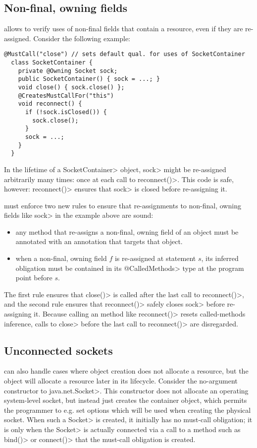 \subsection{Non-final, owning fields}
\label{sec:non-final-owning}

\CreatesMustCallFor allows \tool to verify uses of non-final fields
that contain a resource, even if they are re-assigned. Consider
the following example:

\begin{lstlisting}[frame=tb,belowskip=3mm]
  @MustCall("close") // sets default qual. for uses of SocketContainer
  class SocketContainer {
    private @Owning Socket sock;
    public SocketContainer() { sock = ...; } 
    void close() { sock.close() };
    @CreatesMustCallFor("this")
    void reconnect() {
      if (!sock.isClosed()) {
        sock.close();
      }
      sock = ...;
    }
  }
\end{lstlisting}
In the lifetime of a \<SocketContainer> object, \<sock>
might be re-assigned arbitrarily many times: once at each
call to \<reconnect()>. This code is safe, however: \<reconnect()>
ensures that \<sock> is closed before re-assigning it.

\Tool must enforce two new rules to ensure that
re-assignments to non-final, owning fields like \<sock> in the example
above are sound:
\begin{itemize}
\item any method that re-assigns a non-final, owning field of an object
  must be annotated with an \CreatesMustCallFor annotation
  that targets that object.
\item when a non-final, owning field $f$ is re-assigned at statement $s$,
  its inferred \MustCall obligation must be contained in its \<@CalledMethods>
  type at the program point before $s$.
\end{itemize}
\noindent
The first rule ensures that \<close()> is called after the last call
to \<reconnect()>, and the second rule ensures that \<reconnect()>
safely closes \<sock> before re-assigning it. Because calling
an \CreatesMustCallFor method like \<reconnect()> resets called-methods
inference, calls to \<close> before the last call to \<reconnect()>
are disregarded.

\subsection{Unconnected sockets}
\label{sec:unconnected-sockets}
\CreatesMustCallFor can also handle cases where object creation
does not allocate a resource, but the object will allocate a resource
later in its lifecycle. Consider the no-argument constructor
to \<java.net.Socket>. This constructor does not allocate an
operating system-level socket, but instead just creates the container
object, which permits the programmer to e.g. set options which will be used
when creating the physical socket. When such a \<Socket> is created, it
initially has no must-call obligation; it is only when the \<Socket> is
actually connected via a call to a method such as \<bind()>
or \<connect()> that the must-call obligation is created.


